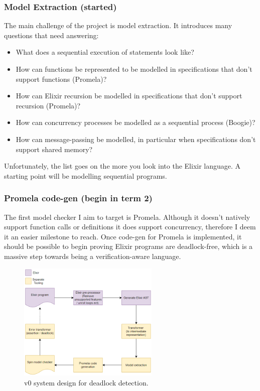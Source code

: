 \subsubsection{Model Extraction (started)}
The main challenge of the project is model extraction. It introduces many questions that need answering:
\begin{itemize}
    \item What does a sequential execution of statements look like?
    \item How can functions be represented to be modelled in specifications that don't support functions (Promela)?
    \item How can Elixir recursion be modelled in specifications that don't support recursion (Promela)?
    \item How can concurrency processes be modelled as a sequential process (Boogie)?
    \item How can message-passing be modelled, in particular when specifications don't support shared memory?
\end{itemize}
Unfortunately, the list goes on the more you look into the Elixir language. A starting point will be modelling sequential programs.
\subsubsection{Promela code-gen (begin in term 2)}
The first model checker I aim to target is Promela. Although it doesn't natively support function calls or definitions it does support concurrency, therefore I deem it an easier milestone to reach. Once code-gen for Promela is implemented, it should be possible to begin proving Elixir programs are deadlock-free, which is a massive step towards being a verification-aware language.
\begin{figure}[h]
    \centering
    \includegraphics[width=0.6\textwidth]{images/system_design_v0.png}
    \caption{v0 system design for deadlock detection.}
    \label{fig:v0_system_design}
\end{figure}
